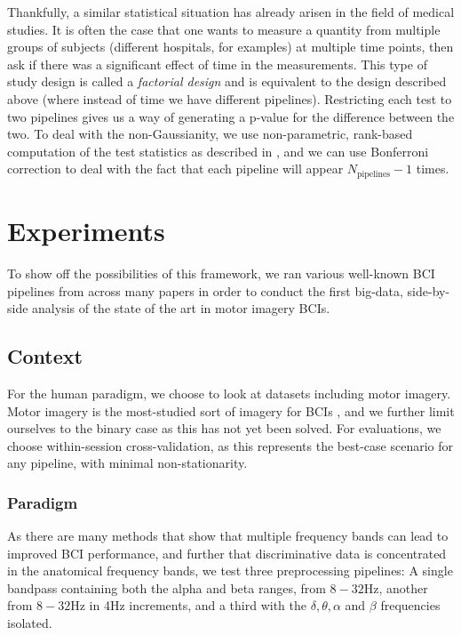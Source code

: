 Thankfully, a similar statistical situation has already arisen in the
field of medical studies. It is often the case that one wants to
measure a quantity from multiple groups of subjects (different
hospitals, for examples) at multiple time points, then ask if there
was a significant effect of time in the measurements. This type of
study design is called a \emph{factorial design} and is equivalent to
the design described above (where instead of time we have different
pipelines). Restricting each test to two pipelines gives us a way of
generating a p-value for the difference between the two. To deal with
the non-Gaussianity, we use non-parametric, rank-based computation of
the test statistics as described in \cite{Noguchi2012}, and we can use
Bonferroni correction to deal with the fact that each pipeline will
appear $N_{\text{pipelines}} - 1$ times.

\section{Experiments}

To show off the possibilities of this framework, we ran various well-known BCI
pipelines from across many papers in order to conduct the first big-data,
side-by-side analysis of the state of the art in motor imagery BCIs.

\subsection{Context}
For the human paradigm, we choose to look at datasets including motor
imagery.  Motor imagery is the most-studied sort of imagery for BCIs
\cite{Yuan2014}, and we further limit ourselves to the binary case as
this has not yet been solved. For evaluations, we choose
within-session cross-validation, as this represents the best-case
scenario for any pipeline, with minimal non-stationarity. 

\subsubsection{Paradigm}
As there are many methods that show that multiple frequency bands can
lead to improved BCI performance\cite{KaiKengAng2008}, and further
that discriminative data is concentrated in the anatomical frequency
bands, we test three preprocessing pipelines: A single bandpass
containing both the alpha and beta ranges, from $8-32\text{Hz}$,
another from $8-32\text{Hz}$ in 4Hz increments, and a third with the
$\delta, \theta, \alpha$ and $\beta$ frequencies isolated.

